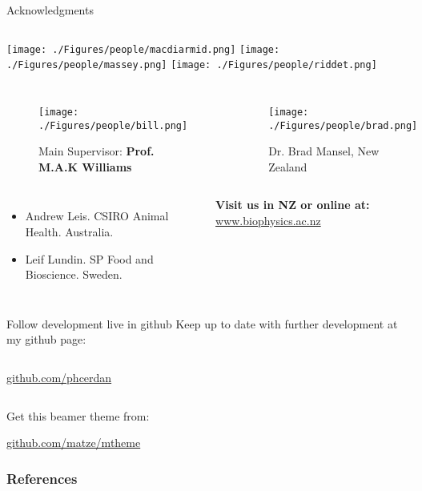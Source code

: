 \documentclass[9pt]{beamer}
\begin{document}
\begin{frame}{Acknowledgments}

  \vspace{0.3cm}
  \begin{columns}[onlytextwidth]
    \texttt{[image: ./Figures/people/macdiarmid.png]}
    \texttt{[image: ./Figures/people/massey.png]}
    \texttt{[image: ./Figures/people/riddet.png]}
  \end{columns}
  \begin{columns}[onlytextwidth]
\begin{figure}[htpb]
  \centering
  \texttt{[image: ./Figures/people/bill.png]}
  \caption*{Main Supervisor: \textbf{Prof. M.A.K Williams}}
\end{figure}
    \begin{figure}[htpb]
      \centering
      \texttt{[image: ./Figures/people/brad.png]}
      \caption*{Dr. Brad Mansel, New Zealand}
    \end{figure}
  \end{columns}
  \begin{columns}[onlytextwidth]
    \begin{itemize}
      \item Andrew Leis. CSIRO Animal Health. Australia.
      \item Leif Lundin. SP Food and Bioscience. Sweden.
    \end{itemize}
    \textbf{Visit us in NZ or online at:}\newline
        \url{www.biophysics.ac.nz}
  \end{columns}
\end{frame}
\begin{frame}{Follow development live in github}
  Keep up to date with further development at my github page:
  \vspace{2mm}
  \begin{columns}[onlytextwidth]
      \begin{center}\url{github.com/phcerdan}\end{center}
  \end{columns}


  \vspace{2mm}
  Get this beamer theme from:

  \begin{center}\url{github.com/matze/mtheme}\end{center}

  \begin{center}\ccbysa\end{center}

\end{frame}
\begin{frame}[allowframebreaks]

  \frametitle{References}

  
  

\end{frame}
\end{document}
